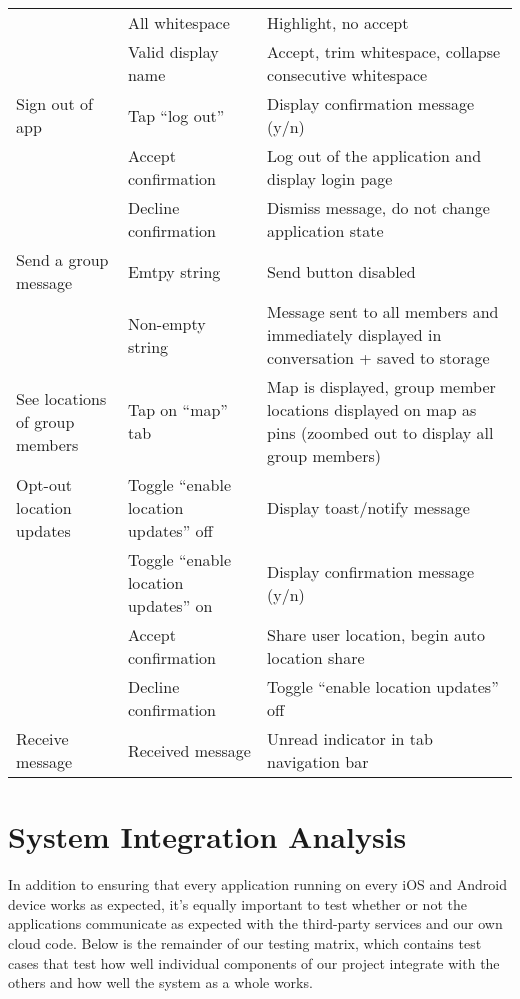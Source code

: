 \begin{tabularx}{\linewidth}{|X|X|X|}
                   & All whitespace & Highlight, no accept \\
                   & Valid display name & Accept, trim whitespace, collapse consecutive whitespace \\
\hline
Sign out of app & Tap ``log out'' & Display confirmation message (y/n) \\
                & Accept confirmation & Log out of the application and display login page \\
                & Decline confirmation & Dismiss message, do not change application state \\
\hline
Send a group message & Emtpy string & Send button disabled \\
                     & Non-empty string & Message sent to all members and immediately displayed in conversation + saved to storage \\
\hline
See locations of group members & Tap on ``map'' tab & Map is displayed, group member locations displayed on map as pins (zoombed out to display all group members) \\
\hline
Opt-out location updates & Toggle ``enable location updates'' off & Display toast/notify message \\
                         & Toggle ``enable location updates'' on & Display confirmation message (y/n) \\
                         & Accept confirmation & Share user location, begin auto location share \\
                         & Decline confirmation & Toggle ``enable location updates'' off \\
\hline
Receive message & Received message & Unread indicator in tab navigation bar \\
\hline
\end{tabularx}




\section{System Integration Analysis} \label{systemIntegrationAnalysis}

In addition to ensuring that every application running on every iOS and Android
device works as expected, it's equally important to test whether or not the
applications communicate as expected with the third-party services and our own
cloud code. Below is the remainder of our testing matrix, which contains test
cases that test how well individual components of our project integrate with the
others and how well the system as a whole works.

